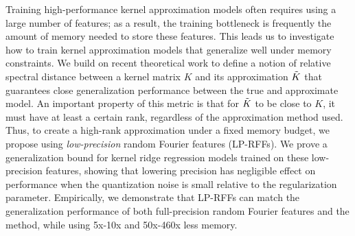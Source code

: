 
Training high-performance kernel approximation models often requires using a large number of features; as a result, the training bottleneck is frequently the amount of memory needed to store these features. This leads us to investigate how to train kernel approximation models that generalize well under memory constraints. We build on recent theoretical work to define a notion of relative spectral distance between a kernel matrix $K$ and its approximation $\tilde{K}$ that guarantees close generalization performance between the true and approximate model. An important property of this metric is that for $\tilde{K}$ to be close to $K$, it must have at least a certain rank, regardless of the approximation method used. Thus, to create a high-rank approximation under a fixed memory budget, we propose using \emph{low-precision} random Fourier features (LP-RFFs). We prove a generalization bound for kernel ridge regression models trained on these low-precision features, showing that lowering precision has negligible effect on performance when the quantization noise is small relative to the regularization parameter. Empirically, we demonstrate that LP-RFFs can match the generalization performance of both full-precision random Fourier features and the \Nystrom method, while using 5x-10x and 50x-460x less memory.


